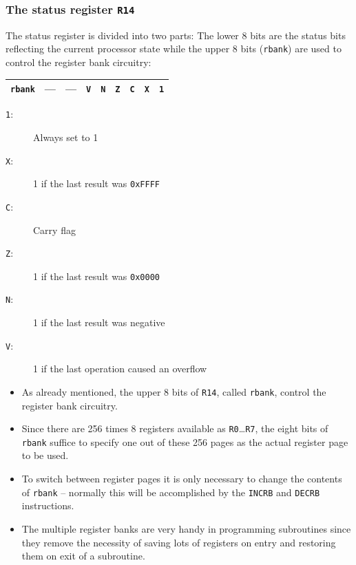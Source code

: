 \documentclass{beamer}
\begin{document}
   \begin{frame}
    \frametitle{The status register {\tt R14}}
    The status register is divided into two parts: The lower
    8 bits are the status bits reflecting the current processor
    state while the upper 8 bits ({\tt rbank}) are used to control 
    the register bank circuitry:
    \begin{center}
     \begin{tabular}{|c||c|c|c|c|c|c|c|c|}
      \hline
       {\tt rbank}&
       ---&---&{\tt V}&{\tt N}&{\tt Z}&{\tt C}&{\tt X}&{\tt 1}\\
      \hline
     \end{tabular}
    \end{center}
    \begin{description}
     \item [{\tt 1}:] Always set to 1
     \item [{\tt X}:] 1 if the last result was {\tt 0xFFFF}
     \item [{\tt C}:] Carry flag
     \item [{\tt Z}:] 1 if the last result was {\tt 0x0000}
     \item [{\tt N}:] 1 if the last result was negative
     \item [{\tt V}:] 1 if the last operation caused an overflow
    \end{description}
   \end{frame}
%
   \begin{frame}
    \begin{itemize}
     \item As already mentioned, the upper 8 bits of {\tt R14}, called
      {\tt rbank}, control the register bank circuitry.
     \item Since there are 256 times 8 registers available as 
      {\tt R0}\dots{\tt R7}, the eight bits of {\tt rbank} suffice to
      specify one out of these 256 pages as the actual register page
      to be used.
     \item To switch between register pages it is only necessary to 
      change the contents of {\tt rbank} -- normally this will be 
      accomplished by the {\tt INCRB} and {\tt DECRB} instructions.
     \item The multiple register banks are very handy in programming
      subroutines since they remove the necessity of saving lots of
      registers on entry and restoring them on exit of a subroutine.
    \end{itemize}
   \end{frame}
\end{document}
